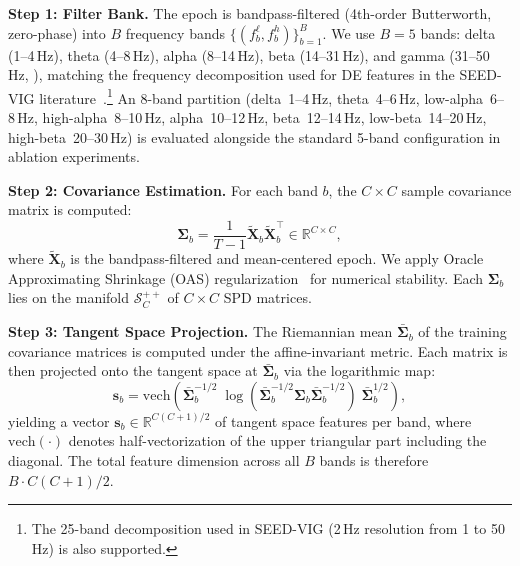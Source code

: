 \documentclass{iopjournal}
\begin{document}
\noindent\textbf{Step 1: Filter Bank.} The epoch is bandpass-filtered (4th-order Butterworth, zero-phase) into $B$ frequency bands $\{ (f^\ell_b, f^h_b) \}_{b=1}^B$. We use $B=5$ bands: delta (1--4\,Hz), theta (4--8\,Hz), alpha (8--14\,Hz), beta (14--31\,Hz), and gamma (31--50\,Hz, ), matching the frequency decomposition used for DE features in the SEED-VIG literature~\cite{zheng2017multimodal}.\footnote{The 25-band decomposition used in SEED-VIG (2\,Hz resolution from 1 to 50\,Hz) is also supported.} An 8-band partition (delta~1--4\,Hz, theta~4--6\,Hz, low-alpha~6--8\,Hz, high-alpha~8--10\,Hz, alpha~10--12\,Hz, beta~12--14\,Hz, low-beta~14--20\,Hz, high-beta~20--30\,Hz) is evaluated alongside the standard 5-band configuration in ablation experiments.

\noindent\textbf{Step 2: Covariance Estimation.} For each band $b$, the $C \times C$ sample covariance matrix is computed:
\begin{equation}
  \mathbf{\Sigma}_b = \frac{1}{T-1} \tilde{\mathbf{X}}_b \tilde{\mathbf{X}}_b^\top \in \mathbb{R}^{C \times C},
\end{equation}
where $\tilde{\mathbf{X}}_b$ is the bandpass-filtered and mean-centered epoch. We apply Oracle Approximating Shrinkage (OAS) regularization~\cite{chen2010shrinkage} for numerical stability. Each $\mathbf{\Sigma}_b$ lies on the manifold $\mathcal{S}_{C}^{++}$ of $C \times C$ SPD matrices.

\noindent\textbf{Step 3: Tangent Space Projection.} The Riemannian mean $\bar{\mathbf{\Sigma}}_b$ of the training covariance matrices is computed under the affine-invariant metric. Each matrix is then projected onto the tangent space at $\bar{\mathbf{\Sigma}}_b$ via the logarithmic map:
\begin{equation}
  \mathbf{s}_b = \mathrm{vech}\left( \bar{\mathbf{\Sigma}}_b^{-1/2} \; \log\left( \bar{\mathbf{\Sigma}}_b^{-1/2} \mathbf{\Sigma}_b \bar{\mathbf{\Sigma}}_b^{-1/2} \right) \; \bar{\mathbf{\Sigma}}_b^{1/2} \right),
\end{equation}
yielding a vector $\mathbf{s}_b \in \mathbb{R}^{C(C+1)/2}$ of tangent space features per band, where $\mathrm{vech}(\cdot)$ denotes half-vectorization of the upper triangular part including the diagonal. The total feature dimension across all $B$ bands is therefore $B \cdot C(C+1)/2$.
\end{document}
